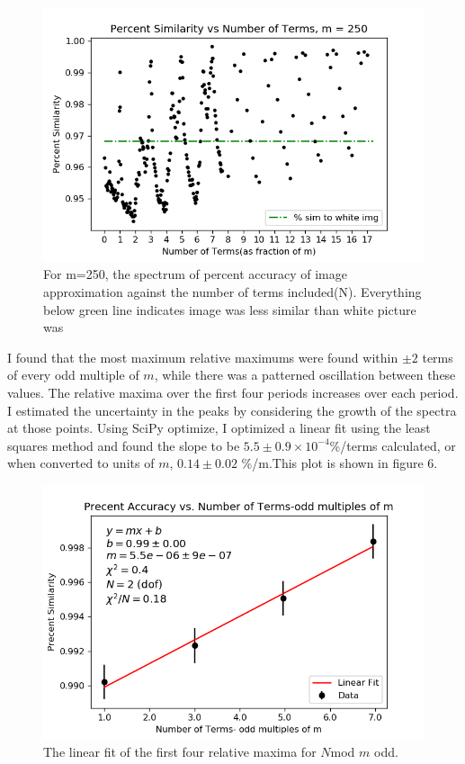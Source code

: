 \documentclass[psamsfonts]{amsart}
\theoremstyle{definition}
\theoremstyle{remark}
\numberwithin{equation}{section}
\begin{document}
\begin{figure}[h!]
	\centering
	\includegraphics[scale=.5]{girl_250_finalplot.png}
	\caption{For m=250, the spectrum of percent accuracy of image approximation against the number of terms included(N).
	Everything below green line indicates image was less similar than white picture was}
\end{figure}


 I found that the most maximum relative maximums were found within $\pm 2$ terms of every odd multiple of $m$, while there was a patterned oscillation between these values. The relative maxima over the first four periods increases over each period. I estimated the uncertainty in the peaks by considering the growth of the spectra at those points. Using SciPy optimize, I optimized a linear fit using the least squares method and found the slope to be $5.5\pm0.9\times 10^{-4}$\%/terms calculated, or when converted to units of $m$,   $0.14 \pm 0.02$ \%/m.This plot is shown in figure 6.
 \begin{figure}[h!]
 	\centering
 	\includegraphics[scale=.4]{girl_250_firstfour.png}
 	\caption{The linear fit of the first four relative maxima for $N$mod $m$ odd.}
 \end{figure}
 
\end{document}
